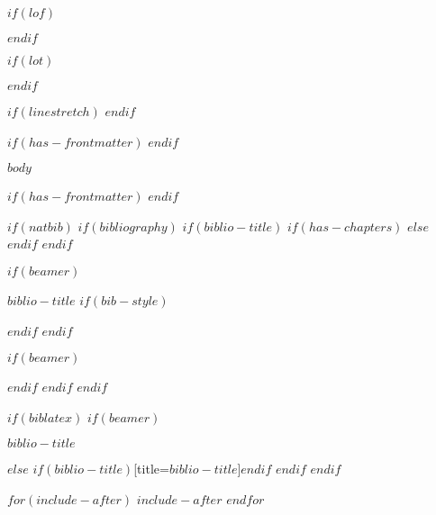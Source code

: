 \documentclass[
  $if(fontsize)$
    $fontsize$,
  $endif$
  $if(papersize)$
    $papersize$paper,
  $else$
    paper=a4,
  $endif$
  $if(beamer)$
    ignorenonframetext,
    $if(handout)$
      handout,
    $endif$
    $if(aspectratio)$
      aspectratio=$aspectratio$,
    $endif$
  $endif$
  $for(classoption)$
    $classoption$$sep$,
  $endfor$
  captions=tableheading
]{$if(beamer)$$documentclass$$else$$if(book)$scrbook$else$scrartcl$endif$$endif$}
\newif\ifbibliography %
\begin{document}

$if(lof)$
  \listoffigures
$endif$

$if(lot)$
  \listoftables
$endif$


$if(linestretch)$
$endif$


$if(has-frontmatter)$
\frontmatter
$endif$

$body$ %

$if(has-frontmatter)$
\backmatter
$endif$


$if(natbib)$
  $if(bibliography)$
    $if(biblio-title)$
      $if(has-chapters)$
        \renewcommand\bibname{$biblio-title$} %
      $else$
        \renewcommand\refname{$biblio-title$} %
      $endif$
    $endif$

    $if(beamer)$
      \begin{frame}[allowframebreaks]{$biblio-title$}
        \bibliographytrue 
        $if(bib-style)$
          
        $endif$
      $endif$
      
      $if(beamer)$
      \end{frame}
      $endif$
  $endif$
$endif$

$if(biblatex)$
  $if(beamer)$
    \begin{frame}[allowframebreaks]{$biblio-title$}
      \bibliographytrue
      \printbibliography[heading=none]
    \end{frame}
  $else$
    \printbibliography$if(biblio-title)$[title=$biblio-title$]$endif$
  $endif$
$endif$

$for(include-after)$
$include-after$
$endfor$
\end{document}
